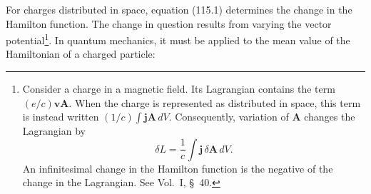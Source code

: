 For charges distributed in space, equation (115.1) determines the change in the
Hamilton function.  The change in question results from varying the vector
potential\footnote{Consider a charge in a magnetic field.  Its Lagrangian
contains the term $(e/c)\mathbf v\mathbf A$.  When the charge is represented as
distributed in space, this term is instead written
$(1/c)\int\mathbf j\mathbf A\,dV$.  Consequently, variation of $\mathbf A$
changes the Lagrangian by
\[
 \delta L=\frac1c\int\mathbf j\,\delta\mathbf A\,dV.
\]
An infinitesimal change in the Hamilton function is the negative of the change
in the Lagrangian.  See Vol.~I, \S~40.}.  In quantum mechanics, it must be
applied to the mean value of the Hamiltonian of a charged particle:
